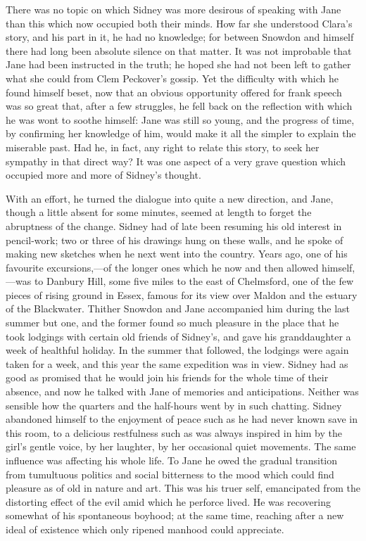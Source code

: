 There was no topic on which Sidney was more desirous of speaking with
Jane than this which now occupied both their minds. How far she
understood Clara's story, and his {\protect\hypertarget{55}{}{}}part in
it, he had no knowledge; for between Snowdon and himself there had long
been absolute silence on that matter. It was not improbable that Jane
had been instructed in the truth; he hoped she had not been left to
gather what she could from Clem Peckover's gossip. Yet the difficulty
with which he found himself beset, now that an obvious opportunity
offered for frank speech was so great that, after a few struggles, he
fell back on the reflection with which he was wont to soothe himself:
Jane was still so young, and the progress of time, by confirming her
knowledge of him, would make it all the simpler to explain the miserable
past. Had he, in fact, any right to relate this story, to seek her
sympathy in that direct way? It was one aspect of a very grave question
which occupied more and more of Sidney's thought.

With an effort, he turned the dialogue into quite a new direction, and
Jane, though a little absent for some minutes, seemed at length to
forget the abruptness of the change. Sidney had of late been resuming
his old {\protect\hypertarget{56}{}{}}interest in pencil-work; two or
three of his drawings hung on these walls, and he spoke of making new
sketches when he next went into the country. Years ago, one of his
favourite excursions,---of the longer ones which he now and then allowed
himself,---was to Danbury Hill, some five miles to the east of
Chelmsford, one of the few pieces of rising ground in Essex, famous for
its view over Maldon and the estuary of the Blackwater. Thither Snowdon
and Jane accompanied him during the last summer but one, and the former
found so much pleasure in the place that he took lodgings with certain
old friends of Sidney's, and gave his granddaughter a week of healthful
holiday. In the summer that followed, the lodgings were again taken for
a week, and this year the same expedition was in view. Sidney had as
good as promised that he would join his friends for the whole time of
their absence, and now he talked with Jane of memories and
anticipations. Neither was sensible how the quarters and the half-hours
went by in such chatting. Sidney {\protect\hypertarget{57}{}{}}abandoned
himself to the enjoyment of peace such as he had never known save in
this room, to a delicious restfulness such as was always inspired in him
by the girl's gentle voice, by her laughter, by her occasional quiet
movements. The same influence was affecting his whole life. To Jane he
owed the gradual transition from tumultuous politics and social
bitterness to the mood which could find pleasure as of old in nature and
art. This was his truer self, emancipated from the distorting effect of
the evil amid which he perforce lived. He was recovering somewhat of his
spontaneous boyhood; at the same time, reaching after a new ideal of
existence which only ripened manhood could appreciate.

